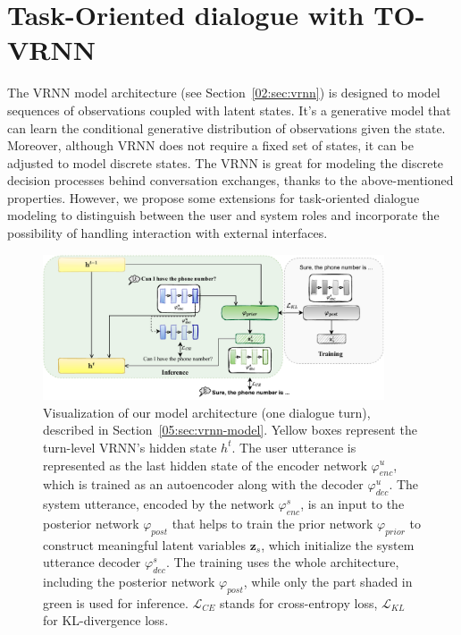 \section{Task-Oriented dialogue with TO-VRNN}
The VRNN model architecture (see Section~\ref{02:sec:vrnn}) is designed to model sequences of observations coupled with latent states.
It's a generative model that can learn the conditional generative distribution of observations given the state.
Moreover, although VRNN does not require a fixed set of states, it can be adjusted to model discrete states.
The VRNN is great for modeling the discrete decision processes behind conversation exchanges, thanks to the above-mentioned properties.
However, we propose some extensions for task-oriented dialogue modeling to distinguish between the user and system roles and incorporate the possibility of handling interaction with external interfaces.
\begin{figure}[t]
    \centering
    \includegraphics[width=0.9\textwidth]{images/vrnn-diagram.pdf}
    \caption{Visualization of our model architecture (one dialogue turn), described in Section~\ref{05:sec:vrnn-model}. Yellow boxes represent the turn-level VRNN's hidden state $h^t$. The user utterance is represented as the last hidden state of the encoder network $\varphi_{enc}^u$, which is trained as an autoencoder along with the decoder $\varphi_{dec}^u$. The system utterance, encoded by the network $\varphi_{enc}^s$, is an input to the posterior network $\varphi_{post}$ that helps to train the prior network $\varphi_{prior}$ to construct meaningful latent variables $\mathbf{z}_s$, which initialize the system utterance decoder $\varphi_{dec}^s$. The training uses the whole architecture, including the posterior network $\varphi_{post}$, while only the part shaded in green is used for inference. $\mathcal{L}_{CE}$ stands for cross-entropy loss, $\mathcal{L}_{KL}$ for KL-divergence loss.}
    \label{05:fig:vrnn_method}
\end{figure}

